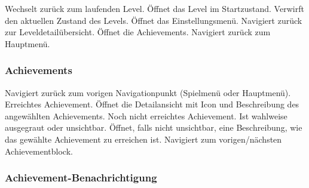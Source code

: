 \begin{requirements}
 Wechselt zurück zum laufenden Level.
 Öffnet das Level im Startzustand. Verwirft den aktuellen Zustand des Levels.
 Öffnet das Einstellungsmenü.
 Navigiert zurück zur Leveldetailübersicht.
 Öffnet die Achievements.
 Navigiert zurück zum Hauptmenü.
\end{requirements}

\subsubsection{Achievements}

\begin{center}
\setlength\fboxsep{20pt}
\setlength\fboxrule{1pt}
\end{center}

\begin{requirements}
 Navigiert zurück zum vorigen Navigationpunkt (Spielmenü oder Hauptmenü).
 Erreichtes Achievement. Öffnet die Detailansicht mit Icon und Beschreibung des angewählten Achievements.
 Noch nicht erreichtes Achievement. Ist wahlweise ausgegraut oder unsichtbar. Öffnet, falls nicht unsichtbar, eine Beschreibung, wie das gewählte Achievement zu erreichen ist.
 Navigiert zum vorigen/nächsten Achievementblock.
\end{requirements}

\subsubsection{Achievement-Benachrichtigung}

